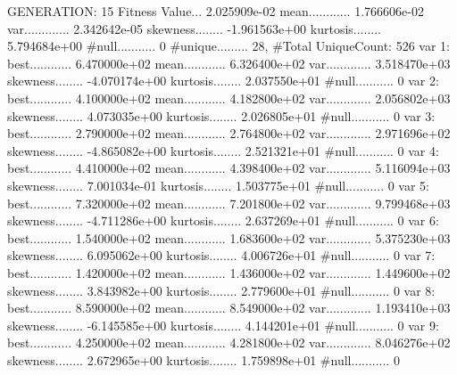 \documentclass[oneside,letterpaper,titlepage]{article}
\begin{document}
\begin{Schunk}
\begin{Soutput}
GENERATION: 15
Fitness Value... 2.025909e-02
mean............ 1.766606e-02
var............. 2.342642e-05
skewness........ -1.961563e+00
kurtosis........ 5.794684e+00
#null........... 0
#unique......... 28, #Total UniqueCount: 526
var 1:
best............ 6.470000e+02
mean............ 6.326400e+02
var............. 3.518470e+03
skewness........ -4.070174e+00
kurtosis........ 2.037550e+01
#null........... 0
var 2:
best............ 4.100000e+02
mean............ 4.182800e+02
var............. 2.056802e+03
skewness........ 4.073035e+00
kurtosis........ 2.026805e+01
#null........... 0
var 3:
best............ 2.790000e+02
mean............ 2.764800e+02
var............. 2.971696e+02
skewness........ -4.865082e+00
kurtosis........ 2.521321e+01
#null........... 0
var 4:
best............ 4.410000e+02
mean............ 4.398400e+02
var............. 5.116094e+03
skewness........ 7.001034e-01
kurtosis........ 1.503775e+01
#null........... 0
var 5:
best............ 7.320000e+02
mean............ 7.201800e+02
var............. 9.799468e+03
skewness........ -4.711286e+00
kurtosis........ 2.637269e+01
#null........... 0
var 6:
best............ 1.540000e+02
mean............ 1.683600e+02
var............. 5.375230e+03
skewness........ 6.095062e+00
kurtosis........ 4.006726e+01
#null........... 0
var 7:
best............ 1.420000e+02
mean............ 1.436000e+02
var............. 1.449600e+02
skewness........ 3.843982e+00
kurtosis........ 2.779600e+01
#null........... 0
var 8:
best............ 8.590000e+02
mean............ 8.549000e+02
var............. 1.193410e+03
skewness........ -6.145585e+00
kurtosis........ 4.144201e+01
#null........... 0
var 9:
best............ 4.250000e+02
mean............ 4.281800e+02
var............. 8.046276e+02
skewness........ 2.672965e+00
kurtosis........ 1.759898e+01
#null........... 0


\end{Soutput}
\end{Schunk}
\end{document}
